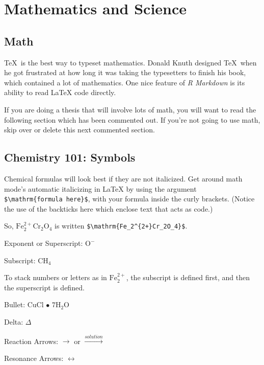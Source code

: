 \documentclass[12pt,twoside]{reedthesis}
\begin{document}
\hypertarget{math-sci}{%
\chapter{Mathematics and Science}\label{math-sci}}

\hypertarget{math}{%
\section{Math}\label{math}}

\TeX~is the best way to typeset mathematics. Donald Knuth designed \TeX~when he got frustrated at how long it was taking the typesetters to finish his book, which contained a lot of mathematics. One nice feature of \emph{R Markdown} is its ability to read LaTeX code directly.

If you are doing a thesis that will involve lots of math, you will want to read the following section which has been commented out. If you're not going to use math, skip over or delete this next commented section.

\hypertarget{chemistry-101-symbols}{%
\section{Chemistry 101: Symbols}\label{chemistry-101-symbols}}

Chemical formulas will look best if they are not italicized. Get around math mode's automatic italicizing in LaTeX by using the argument \texttt{\$\textbackslash{}mathrm\{formula\ here\}\$}, with your formula inside the curly brackets. (Notice the use of the backticks here which enclose text that acts as code.)

So, \(\mathrm{Fe_2^{2+}Cr_2O_4}\) is written \texttt{\$\textbackslash{}mathrm\{Fe\_2\^{}\{2+\}Cr\_2O\_4\}\$}.

\noindent Exponent or Superscript: \(\mathrm{O^-}\)

\noindent Subscript: \(\mathrm{CH_4}\)

To stack numbers or letters as in \(\mathrm{Fe_2^{2+}}\), the subscript is defined first, and then the superscript is defined.

\noindent Bullet: CuCl \(\bullet\) \(\mathrm{7H_{2}O}\)

\noindent Delta: \(\Delta\)

\noindent Reaction Arrows: \(\longrightarrow\) or \(\xrightarrow{solution}\)

\noindent Resonance Arrows: \(\leftrightarrow\)
\end{document}
